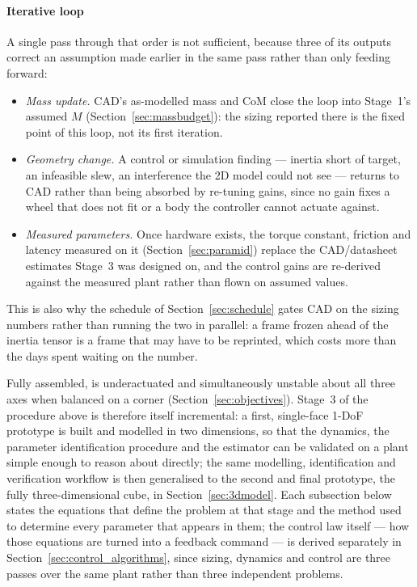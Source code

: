 \paragraph{Iterative loop} A single pass through that order is not sufficient,
because three of its outputs correct an assumption made earlier in the same
pass rather than only feeding forward:
\begin{itemize}
\item \emph{Mass update.} CAD's as-modelled mass and CoM close the loop into
  Stage~1's assumed $M$ (Section~\ref{sec:massbudget}): the sizing reported
  there is the fixed point of this loop, not its first iteration.
\item \emph{Geometry change.} A control or simulation finding --- inertia
  short of target, an infeasible slew, an interference the 2D model could not
  see --- returns to CAD rather than being absorbed by re-tuning gains, since
  no gain fixes a wheel that does not fit or a body the controller cannot
  actuate against.
\item \emph{Measured parameters.} Once hardware exists, the torque constant,
  friction and latency measured on it (Section~\ref{sec:paramid}) replace the
  CAD/datasheet estimates Stage~3 was designed on, and the control gains are
  re-derived against the measured plant rather than flown on assumed values.
\end{itemize}
This is also why the schedule of Section~\ref{sec:schedule} gates CAD on the
sizing numbers rather than running the two in parallel: a frame frozen ahead
of the inertia tensor is a frame that may have to be reprinted, which costs
more than the days spent waiting on the number.

Fully assembled, \projectname{} is underactuated and simultaneously unstable
about all three axes when balanced on a corner (Section~\ref{sec:objectives}). Stage~3 of the
procedure above is therefore itself incremental: a first, single-face 1-DoF
prototype is built and modelled in two dimensions, so that the dynamics, the
parameter identification procedure and the estimator can be validated on a
plant simple enough to reason about directly; the same modelling,
identification and verification workflow is then generalised to the second
and final prototype, the fully three-dimensional cube, in
Section~\ref{sec:3dmodel}. Each subsection below states the equations that
define the problem at that stage and the method used to determine every
parameter that appears in them; the control law itself --- how those
equations are turned into a feedback command --- is derived separately in
Section~\ref{sec:control_algorithms}, since sizing, dynamics and control are
three passes over the same plant rather than three independent problems.

